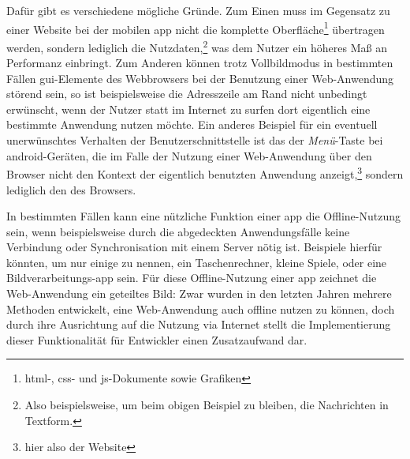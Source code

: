 Dafür gibt es verschiedene mögliche Gründe. Zum Einen muss im Gegensatz zu einer Website bei der mobilen \gls{app} nicht die komplette Oberfläche\footnote{\gls{html}-, \gls{css}- und \gls{js}-Dokumente sowie Grafiken} übertragen werden, sondern lediglich die Nutzdaten,\footnote{Also beispielsweise, um beim obigen Beispiel zu bleiben, die Nachrichten in Textform.} was dem Nutzer ein höheres Maß an Performanz einbringt.
Zum Anderen können trotz Vollbildmodus in bestimmten Fällen \gls{gui}-Elemente des Webbrowsers bei der Benutzung einer Web-Anwendung störend sein, so ist beispielsweise die Adresszeile am Rand nicht unbedingt erwünscht, wenn der Nutzer statt im Internet zu surfen dort eigentlich eine bestimmte Anwendung nutzen möchte. 
Ein anderes Beispiel für ein eventuell unerwünschtes Verhalten der Benutzerschnittstelle ist das der \emph{Menü}-Taste bei \gls{android}-Geräten, die im Falle der Nutzung einer Web-Anwendung über den Browser nicht den Kontext der eigentlich benutzten Anwendung anzeigt,\footnote{hier also der Website} sondern lediglich den des Browsers.

In bestimmten Fällen kann eine nützliche Funktion einer \gls{app} die Offline-Nutzung sein, wenn beispielsweise durch die abgedeckten Anwendungsfälle keine Verbindung oder Synchronisation mit einem Server nötig ist. Beispiele hierfür könnten, um nur einige zu nennen, ein Taschenrechner, kleine Spiele, oder eine Bildverarbeitungs-\gls{app} sein. 
Für diese Offline-Nutzung einer \gls{app} zeichnet die Web-Anwendung ein geteiltes Bild: Zwar wurden in den letzten Jahren mehrere Methoden entwickelt, eine Web-Anwendung auch offline nutzen zu können, doch durch ihre Ausrichtung auf die Nutzung via Internet stellt die Implementierung dieser Funktionalität für Entwickler einen Zusatzaufwand dar. 

